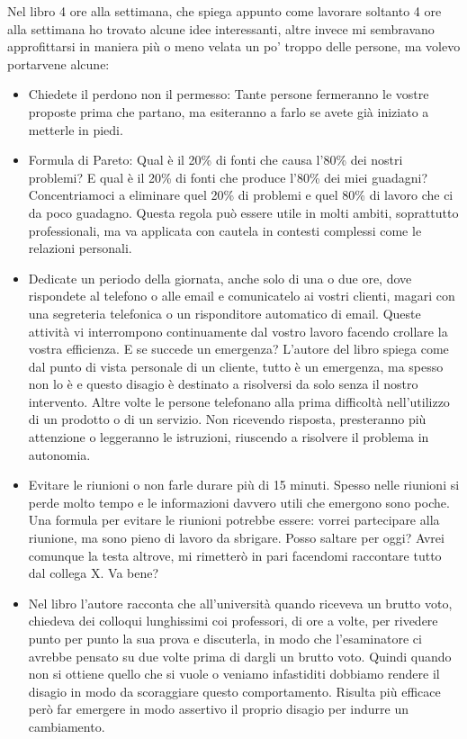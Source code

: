 \documentclass[12pt]{book} %
\begin{document}
\begin{mdframed}[linewidth=1pt]
Nel libro 4 ore alla settimana, che spiega appunto come lavorare soltanto
4 ore alla settimana ho trovato alcune idee interessanti, altre invece mi sembravano approfittarsi in maniera più o
meno velata un po' troppo delle persone, ma volevo portarvene alcune:

\begin{itemize}
\item Chiedete il perdono non il permesso: Tante persone fermeranno le vostre proposte prima che partano, ma esiteranno
a farlo se avete già iniziato a metterle in piedi.
\item Formula di Pareto: Qual è il 20\% di fonti che causa l'80\% dei nostri problemi? E qual è il
20\% di fonti che produce l'80\% dei miei guadagni? Concentriamoci a eliminare quel 20\% di
problemi e quel 80\% di lavoro che ci da poco guadagno. Questa regola può essere utile in molti ambiti, soprattutto professionali, ma va applicata con cautela in contesti complessi come le relazioni personali.
\item Dedicate un periodo della giornata, anche solo di una o due ore, dove rispondete al telefono o alle email e
comunicatelo ai vostri clienti, magari con una segreteria telefonica o un risponditore automatico di email. Queste
attività vi interrompono continuamente dal vostro lavoro facendo crollare la vostra efficienza. E se succede un
emergenza? L'autore del libro spiega come dal punto di vista personale di un cliente, tutto è un
emergenza, ma spesso non lo è e questo disagio è destinato a risolversi da solo senza il nostro intervento. Altre volte
le persone telefonano alla prima difficoltà nell'utilizzo di un prodotto o di un servizio. Non
ricevendo risposta, presteranno più attenzione o leggeranno le istruzioni, riuscendo a risolvere il problema in
autonomia.
\item Evitare le riunioni o non farle durare più di 15 minuti. Spesso nelle riunioni si perde molto tempo e le
informazioni davvero utili che emergono sono poche. Una formula per evitare le riunioni potrebbe essere: vorrei
partecipare alla riunione, ma sono pieno di lavoro da sbrigare. Posso saltare per oggi? Avrei comunque la testa
altrove, mi rimetterò in pari facendomi raccontare tutto dal collega X. Va bene?
\item Nel libro l'autore racconta che all'università quando riceveva un brutto voto, chiedeva dei colloqui lunghissimi
coi professori, di ore a volte, per rivedere punto per punto la sua prova e discuterla, in modo che l'esaminatore ci
avrebbe pensato su due volte prima di dargli un brutto voto. Quindi quando non si ottiene quello che si vuole o veniamo
infastiditi dobbiamo rendere il disagio in modo da scoraggiare questo comportamento. Risulta più efficace però far emergere in modo assertivo il proprio disagio per indurre un cambiamento.
\end{itemize}
\end{mdframed}
\end{document}
